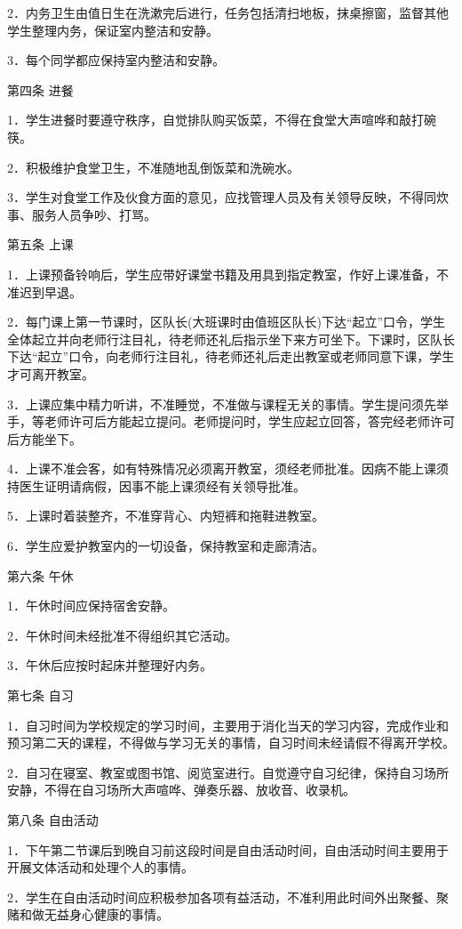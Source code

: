 \documentclass[UTF8,12pt,a4paper]{report}
\begin{document}
2．内务卫生由值日生在洗漱完后进行，任务包括清扫地板，抹桌擦窗，监督其他学生整理内务，保证室内整洁和安静。

3．每个同学都应保持室内整洁和安静。

第四条 进餐

1．学生进餐时要遵守秩序，自觉排队购买饭菜，不得在食堂大声喧哗和敲打碗筷。

2．积极维护食堂卫生，不准随地乱倒饭菜和洗碗水。

3．学生对食堂工作及伙食方面的意见，应找管理人员及有关领导反映，不得同炊事、服务人员争吵、打骂。

第五条 上课

1．上课预备铃响后，学生应带好课堂书籍及用具到指定教室，作好上课准备，不准迟到早退。

2．每门课上第一节课时，区队长(大班课时由值班区队长)下达“起立”口令，学生全体起立并向老师行注目礼，待老师还礼后指示坐下来方可坐下。下课时，区队长下达“起立”口令，向老师行注目礼，待老师还礼后走出教室或老师同意下课，学生才可离开教室。

3．上课应集中精力听讲，不准睡觉，不准做与课程无关的事情。学生提问须先举手，等老师许可后方能起立提问。老师提问时，学生应起立回答，答完经老师许可后方能坐下。

4．上课不准会客，如有特殊情况必须离开教室，须经老师批准。因病不能上课须持医生证明请病假，因事不能上课须经有关领导批准。

5．上课时着装整齐，不准穿背心、内短裤和拖鞋进教室。

6．学生应爱护教室内的一切设备，保持教室和走廊清洁。

第六条 午休

1．午休时间应保持宿舍安静。

2．午休时间未经批准不得组织其它活动。

3．午休后应按时起床并整理好内务。

第七条 自习

1．自习时间为学校规定的学习时间，主要用于消化当天的学习内容，完成作业和预习第二天的课程，不得做与学习无关的事情，自习时间未经请假不得离开学校。

2．自习在寝室、教室或图书馆、阅览室进行。自觉遵守自习纪律，保持自习场所安静，不得在自习场所大声喧哗、弹奏乐器、放收音、收录机。

第八条 自由活动

1．下午第二节课后到晚自习前这段时间是自由活动时间，自由活动时间主要用于开展文体活动和处理个人的事情。

2．学生在自由活动时间应积极参加各项有益活动，不准利用此时间外出聚餐、聚赌和做无益身心健康的事情。
\end{document}
